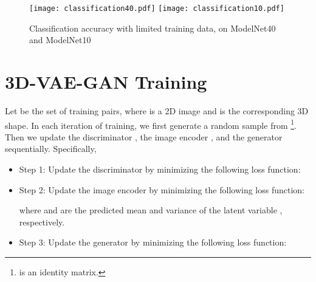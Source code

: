 \documentclass{article}
\newcommand{\vaemodel}{3D-VAE-GAN\xspace}
\begin{document}
\begin{figure}[h]
\centering
\texttt{[image: classification40.pdf]}
\qquad
\texttt{[image: classification10.pdf]} 
\caption{Classification accuracy with limited training data, on ModelNet40 and ModelNet10}
\label{fig:classification_detail}
\end{figure}

\section{\vaemodel Training}

Let  be the set of training pairs, where  is a 2D image and  is the corresponding 3D shape. In each iteration  of training, we first generate a random sample  from \footnote{ is an identity matrix.}. Then we update the discriminator , the image encoder , and the generator  sequentially. Specifically,

\begin{itemize}
\item Step 1: Update the discriminator  by minimizing the following loss function:


\item Step 2: Update the image encoder  by minimizing the following loss function:

where  and  are the predicted mean and variance of the latent variable , respectively.

\item Step 3: Update the generator  by minimizing the following loss function:

\end{itemize}
\end{document}
